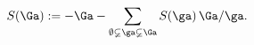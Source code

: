 \begin{equation}
S(\Ga) := - \Ga -
\sum_{\emptyset \varsubsetneq \ga \varsubsetneq \Ga} S(\ga) \, \Ga/\ga.
\label{eq:Bogol-recurgraph}%
\end{equation}

